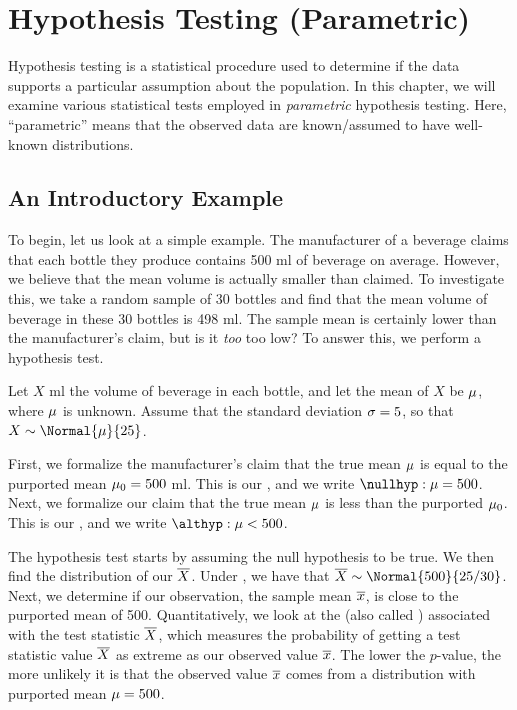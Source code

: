 \chapter{Hypothesis Testing (Parametric)}

Hypothesis testing is a statistical procedure used to determine if the data supports a particular assumption about the population. In this chapter, we will examine various statistical tests employed in \emph{parametric} hypothesis testing. Here, ``parametric'' means that the observed data are known/assumed to have well-known distributions.

\section{An Introductory Example}

To begin, let us look at a simple example. The manufacturer of a beverage claims that each bottle they produce contains 500 ml of beverage on average. However, we believe that the mean volume is actually smaller than claimed. To investigate this, we take a random sample of 30 bottles and find that the mean volume of beverage in these 30 bottles is 498 ml. The sample mean is certainly lower than the manufacturer's claim, but is it \emph{too} too low? To answer this, we perform a hypothesis test.

Let $X$ ml the volume of beverage in each bottle, and let the mean of $X$ be $\mu$, where $\mu$ is unknown. Assume that the standard deviation $\sigma = 5$, so that $X \sim \Normal{\m}{25}$.

First, we formalize the manufacturer's claim that the true mean $\mu$ is equal to the purported mean $\mu_0 = 500$ ml. This is our , and we write $\nullhyp: \m = 500$. Next, we formalize our claim that the true mean $\mu$ is less than the purported $\mu_0$. This is our , and we write $\althyp: \m < 500$.

The hypothesis test starts by assuming the null hypothesis \nullhyp{} to be true. We then find the distribution of our  $\overline{X}$. Under \nullhyp, we have that $\ol{X} \sim \Normal{500}{25/30}$. Next, we determine if our observation, the sample mean $\overline{x}$, is close to the purported mean of 500. Quantitatively, we look at the  (also called ) associated with the test statistic $\overline{X}$, which measures the probability of getting a test statistic value $\overline{X}$ as extreme as our observed value $\overline{x}$. The lower the $p$-value, the more unlikely it is that the observed value $\overline{x}$ comes from a distribution with purported mean $\mu = 500$.

